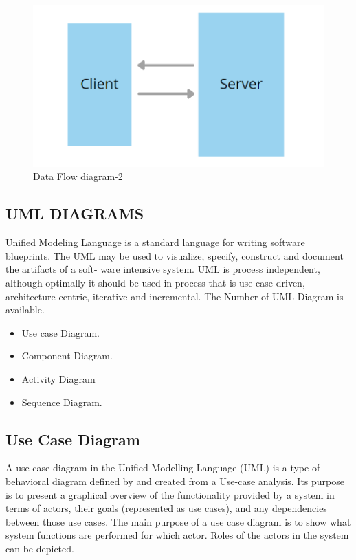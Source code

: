 \documentclass[12pt]{report}
\begin{document}
\vspace{1.5cm}
\begin{figure}[h]
\centering
\includegraphics[scale=1.0]{ Data Flow diagram-1.png}
\caption{ Data Flow diagram-2}
\label{ Data Flow diagram-2}
\end{figure}


\clearpage
\justifying
\setlength{\parindent}{4em}
\setlength{\parskip}{0.5em}
\renewcommand{\baselinestretch}{1.5}
\normalsize
\subsection{UML DIAGRAMS}
Unified Modeling Language is a standard language for writing software blueprints. The
UML may be used to visualize, specify, construct and document the artifacts of a soft- ware
intensive system. UML is process independent, although optimally it should be used in
process that is use case driven, architecture centric, iterative and incremental. The Number
of UML Diagram is available.


\begin{itemize}
\item Use case Diagram.

\item Component Diagram.

\item Activity Diagram

\item  Sequence Diagram.

\end{itemize}

\clearpage


\justifying
\setlength{\parindent}{4em}
\setlength{\parskip}{0.5em}
\renewcommand{\baselinestretch}{1.5}
\normalsize
\subsection{Use Case Diagram}
A use case diagram in the Unified Modelling Language (UML) is a type of behavioral
diagram defined by and created from a Use-case analysis. Its purpose is to present a graphical 
overview of the functionality provided by a system in terms of actors, their goals 
(represented as use cases), and any dependencies between those use cases. The main purpose 
of a use case diagram is to show what system functions are performed for which actor. Roles 
of the actors in the system can be depicted.
\end{document}
